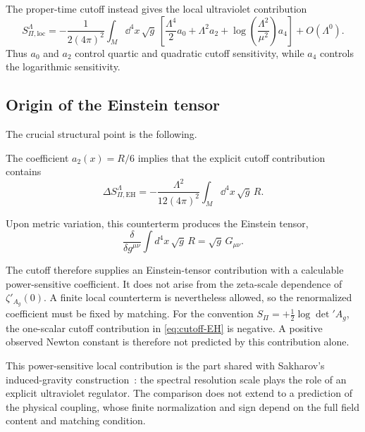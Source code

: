 \documentclass[pdflatex,sn-mathphys-num]{sn-jnl} %
\theoremstyle{remark}
\theoremstyle{plain}
\begin{document}
    The proper-time cutoff instead gives the local ultraviolet contribution
    \begin{equation}
      S_{\Pi,\mathrm{loc}}^\Lambda
      =
      -\frac{1}{2(4\pi)^2}
      \int_M\dd^4x\,\sqrt{g}\,
      \left[
        \frac{\Lambda^4}{2}a_0
        +\Lambda^2a_2
        +\log\!\left(\frac{\Lambda^2}{\mu^2}\right)a_4
      \right]
      +O(\Lambda^0).
      \label{eq:cutoff-local}
    \end{equation}
    Thus $a_0$ and $a_2$ control quartic and quadratic cutoff sensitivity, while $a_4$ controls the logarithmic
    sensitivity.

  \subsection{Origin of the Einstein tensor}
    \label{subsec:einstein-origin}

    The crucial structural point is the following.

    The coefficient $a_2(x)=R/6$ implies that the explicit cutoff contribution contains
    \begin{equation}
      \Delta S_{\Pi,\mathrm{EH}}^\Lambda
      =
      -\frac{\Lambda^2}{12(4\pi)^2}
      \int_M\dd^4x\,\sqrt{g}\,R.
      \label{eq:cutoff-EH}
    \end{equation}

    Upon metric variation, this counterterm produces the Einstein tensor,
    \begin{equation}
      \frac{\delta}{\delta g^{\mu\nu}}
      \int d^4x\,\sqrt{g}\, R
      =
      \sqrt{g}\,G_{\mu\nu} .
    \end{equation}

    The cutoff therefore supplies an Einstein-tensor contribution with a calculable power-sensitive coefficient.
    It does not arise from the zeta-scale dependence of $\zeta'_{A_g}(0)$.
    A finite local counterterm is nevertheless allowed, so the renormalized coefficient must be fixed by matching.
    For the convention $S_\Pi=+\tfrac12\log\det' A_g$, the one-scalar cutoff contribution in
    \eqref{eq:cutoff-EH} is negative.
    A positive observed Newton constant is therefore not predicted by this contribution alone.

    This power-sensitive local contribution is the part shared with Sakharov's induced-gravity
    construction~\cite{Sakharov1967}: the spectral resolution scale plays the role of an explicit ultraviolet regulator.
    The comparison does not extend to a prediction of the physical coupling, whose finite normalization and sign depend
    on the full field content and matching condition.
\end{document}

